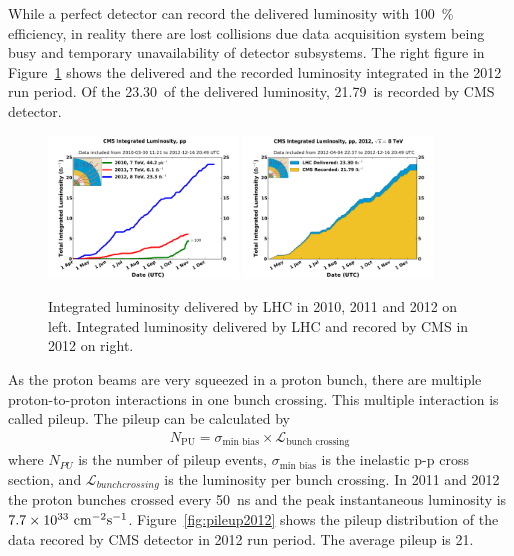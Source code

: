 While a perfect detector can record the delivered luminosity 
with 100~\% efficiency, in reality there are lost collisions 
due data acquisition system being busy and temporary unavailability 
of detector subsystems.  
The right figure in Figure~\ref{fig:intlumi} shows the delivered and the recorded luminosity 
integrated in the 2012 run period. Of the 23.30~\ifb of the delivered luminosity,  
21.79~\ifb is recorded by CMS detector.  

%
\begin{figure}[ht!] 
\centering 
\includegraphics[width=0.45\textwidth]{figures/int_lumi_cumulative_pp_2.pdf}
\includegraphics[width=0.45\textwidth]{figures/int_lumi_per_day_cumulative_pp_2012.pdf}
\caption{Integrated luminosity delivered by LHC in 2010, 2011 and 2012 on left. 
Integrated luminosity delivered by LHC and recored by CMS in 2012 on right.} 
\label{fig:intlumi} 
\end{figure} 

As the proton beams are very squeezed in a proton bunch, there are multiple 
proton-to-proton interactions in one bunch crossing. This multiple interaction 
is called pileup. The pileup can be calculated by 
\begin{eqnarray} 
N_\textrm{{PU}} 
= 
\sigma_{\textrm{min bias}} \times \mathcal{L}_{\textrm{bunch crossing}} 
\end{eqnarray} 
where $N_{PU}$ is the number of pileup events, 
$\sigma_{\textrm{min bias}}$ is the inelastic p-p cross section, 
and $\mathcal{L}_{bunch crossing}$ is the luminosity per bunch crossing.
In 2011 and 2012 the proton bunches crossed every 50~ns 
and the peak instantaneous luminosity is $7.7\times 10^{33} ~\mathrm{cm}^{-2}\textrm{s}^{-1}$. 
Figure~\ref{fig:pileup2012} shows the pileup distribution 
of the data recored by CMS detector in 2012 run period. 
The average pileup is 21. 



